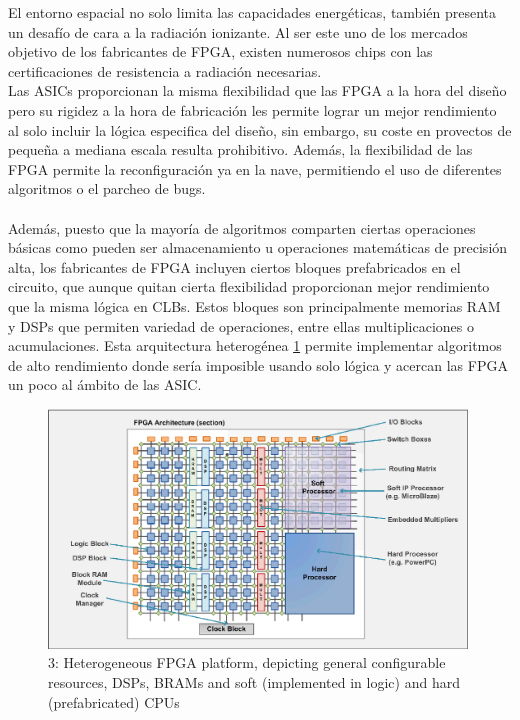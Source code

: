 El entorno espacial no solo limita las capacidades energéticas, también presenta un desafío de cara a la radiación ionizante. Al ser este uno de los mercados objetivo de los fabricantes de FPGA, existen numerosos chips con las certificaciones de resistencia a radiación necesarias.
\\
Las ASICs proporcionan la misma flexibilidad que las FPGA a la hora del diseño pero su rigidez a la hora de fabricación les permite lograr un mejor rendimiento al solo incluir la lógica especifica del diseño, sin embargo, su coste en provectos de pequeña a mediana escala resulta prohibitivo. Además, la flexibilidad de las FPGA permite la reconfiguración ya en la nave, permitiendo el uso de diferentes algoritmos o el parcheo de bugs.
\\
\\
Además, puesto que la mayoría de algoritmos comparten ciertas operaciones básicas como pueden ser almacenamiento u operaciones matemáticas de precisión alta, los fabricantes de FPGA incluyen ciertos bloques prefabricados en el circuito, que aunque quitan cierta flexibilidad proporcionan mejor rendimiento que la misma lógica en CLBs. Estos bloques son principalmente memorias RAM y DSPs que permiten variedad de operaciones, entre ellas multiplicaciones o acumulaciones. Esta arquitectura heterogénea \ref{fig:heterogenea} permite implementar algoritmos de alto rendimiento donde sería imposible usando solo lógica y acercan las FPGA un poco al ámbito de las ASIC\cite{zhou_efficient_2013}.
\\
\begin{figure}[h!]
\centering
\includegraphics[height=2.5in]{figures/FPGA_heterogenea.png}
\caption{3: Heterogeneous FPGA platform, depicting general configurable resources, DSPs, BRAMs and soft (implemented in logic) and hard (prefabricated) CPUs}
  \label{fig:heterogenea}
\end{figure}
\\

